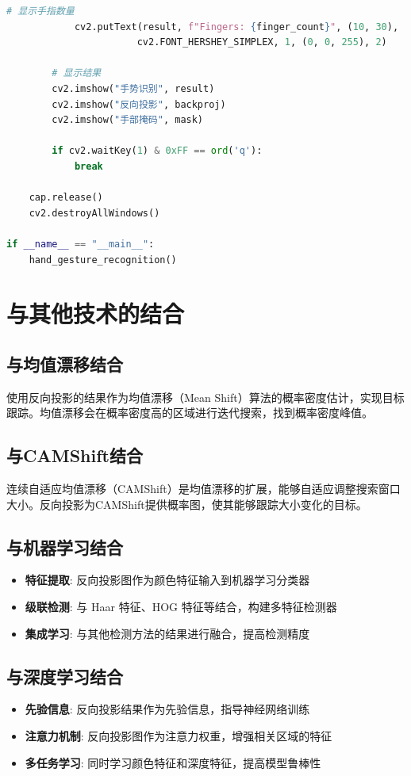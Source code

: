 \documentclass{article}
\begin{document}
\begin{lstlisting}[language=Python, caption={基于直方图反向投影的手势检测}]
            # 显示手指数量
            cv2.putText(result, f"Fingers: {finger_count}", (10, 30),
                       cv2.FONT_HERSHEY_SIMPLEX, 1, (0, 0, 255), 2)

        # 显示结果
        cv2.imshow("手势识别", result)
        cv2.imshow("反向投影", backproj)
        cv2.imshow("手部掩码", mask)

        if cv2.waitKey(1) & 0xFF == ord('q'):
            break

    cap.release()
    cv2.destroyAllWindows()

if __name__ == "__main__":
    hand_gesture_recognition()
\end{lstlisting}

\section{与其他技术的结合}

\subsection{与均值漂移结合}
使用反向投影的结果作为均值漂移（Mean Shift）算法的概率密度估计，实现目标跟踪。均值漂移会在概率密度高的区域进行迭代搜索，找到概率密度峰值。

\subsection{与CAMShift结合}
连续自适应均值漂移（CAMShift）是均值漂移的扩展，能够自适应调整搜索窗口大小。反向投影为CAMShift提供概率图，使其能够跟踪大小变化的目标。

\subsection{与机器学习结合}
\begin{itemize}
    \item \textbf{特征提取}: 反向投影图作为颜色特征输入到机器学习分类器
    \item \textbf{级联检测}: 与 Haar 特征、HOG 特征等结合，构建多特征检测器
    \item \textbf{集成学习}: 与其他检测方法的结果进行融合，提高检测精度
\end{itemize}

\subsection{与深度学习结合}
\begin{itemize}
    \item \textbf{先验信息}: 反向投影结果作为先验信息，指导神经网络训练
    \item \textbf{注意力机制}: 反向投影图作为注意力权重，增强相关区域的特征
    \item \textbf{多任务学习}: 同时学习颜色特征和深度特征，提高模型鲁棒性
\end{itemize}
\end{document}
